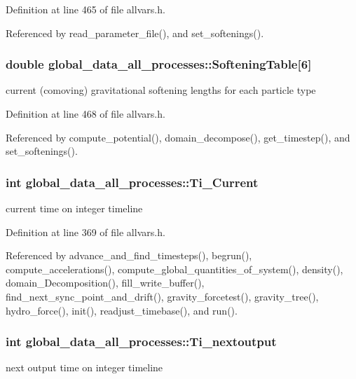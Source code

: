 Definition at line 465 of file allvars.h.



Referenced by read\_\-parameter\_\-file(), and set\_\-softenings().

\hypertarget{structglobal__data__all__processes_a5d557dca41d454bbc34153a0df2a4338}{
\subsubsection[{SofteningTable}]{\setlength{\rightskip}{0pt plus 5cm}double {\bf global\_\-data\_\-all\_\-processes::SofteningTable}\mbox{[}6\mbox{]}}}
\label{structglobal__data__all__processes_a5d557dca41d454bbc34153a0df2a4338}
current (comoving) gravitational softening lengths for each particle type 

Definition at line 468 of file allvars.h.



Referenced by compute\_\-potential(), domain\_\-decompose(), get\_\-timestep(), and set\_\-softenings().

\hypertarget{structglobal__data__all__processes_ab0720db6b598f7295ec843708a1d3c6f}{
\subsubsection[{Ti\_\-Current}]{\setlength{\rightskip}{0pt plus 5cm}int {\bf global\_\-data\_\-all\_\-processes::Ti\_\-Current}}}
\label{structglobal__data__all__processes_ab0720db6b598f7295ec843708a1d3c6f}
current time on integer timeline 

Definition at line 369 of file allvars.h.



Referenced by advance\_\-and\_\-find\_\-timesteps(), begrun(), compute\_\-accelerations(), compute\_\-global\_\-quantities\_\-of\_\-system(), density(), domain\_\-Decomposition(), fill\_\-write\_\-buffer(), find\_\-next\_\-sync\_\-point\_\-and\_\-drift(), gravity\_\-forcetest(), gravity\_\-tree(), hydro\_\-force(), init(), readjust\_\-timebase(), and run().

\hypertarget{structglobal__data__all__processes_af1655016614a8c7ae59520abae300f67}{
\subsubsection[{Ti\_\-nextoutput}]{\setlength{\rightskip}{0pt plus 5cm}int {\bf global\_\-data\_\-all\_\-processes::Ti\_\-nextoutput}}}
\label{structglobal__data__all__processes_af1655016614a8c7ae59520abae300f67}
next output time on integer timeline 

